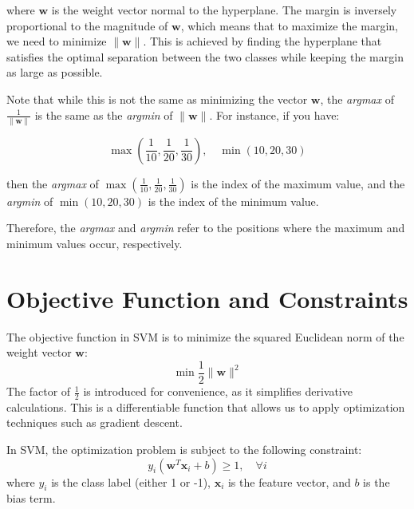 where \( \mathbf{w} \) is the weight vector normal to the hyperplane. The margin is inversely proportional to the magnitude of \( \mathbf{w} \), which means that to maximize the margin, we need to minimize \( \| \mathbf{w} \| \). This is achieved by finding the hyperplane that satisfies the optimal separation between the two classes while keeping the margin as large as possible. 

Note that while this is not the same as minimizing the vector \( \mathbf{w} \), the \textit{argmax} of \( \frac{1}{\| \mathbf{w} \|} \) is the same as the \textit{argmin} of \( \| \mathbf{w} \| \). For instance, if you have:

\[
\max(\frac{1}{10}, \frac{1}{20}, \frac{1}{30}), \quad \min(10, 20, 30)
\]

then the \textit{argmax} of \( \max(\frac{1}{10}, \frac{1}{20}, \frac{1}{30}) \) is the index of the maximum value, and the \textit{argmin} of \( \min(10, 20, 30) \) is the index of the minimum value. 

Therefore, the \textit{argmax} and \textit{argmin} refer to the positions where the maximum and minimum values occur, respectively.

\section{Objective Function and Constraints}

The objective function in SVM is to minimize the squared Euclidean norm of the weight vector \( \mathbf{w} \):
\[
\min \frac{1}{2} \| \mathbf{w} \|^2
\]
The factor of \( \frac{1}{2} \) is introduced for convenience, as it simplifies derivative calculations. This is a differentiable function that allows us to apply optimization techniques such as gradient descent.

In SVM, the optimization problem is subject to the following constraint:
\[
y_i (\mathbf{w}^T \mathbf{x}_i + b) \geq 1, \quad \forall i
\]
where \( y_i \) is the class label (either 1 or -1), \( \mathbf{x}_i \) is the feature vector, and \( b \) is the bias term.

